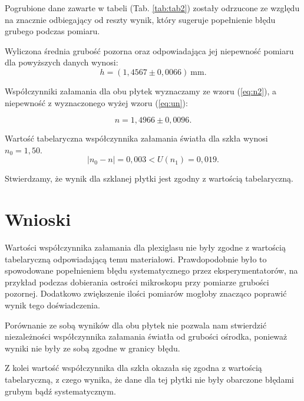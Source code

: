 \documentclass[12pt,a4paper]{article}
\numberwithin{equation}{section}
\begin{document}
Pogrubione dane zawarte w tabeli (Tab. \ref{tab:tab2}) zostały odrzucone ze względu na znacznie odbiegający od reszty wynik, który sugeruje popełnienie błędu grubego podczas pomiaru.

\pagebreak
Wyliczona średnia grubość pozorna oraz odpowiadająca jej niepewność pomiaru dla powyższych danych wynosi:
\begin{equation}
	h = (1,4567 \pm 0,0066)~\textrm{mm}.
\end{equation}

Współczynniki załamania dla obu płytek wyznaczamy ze wzoru (\ref{eq:n2}), a niepewność z wyznaczonego wyżej wzoru (\ref{eq:un}):

\begin{equation}
	n = 1,4966 \pm 0,0096.
\end{equation}

Wartość tabelaryczna współczynnika załamania światła dla szkła wynosi $n_0 = 1,50$.
\begin{equation}
	|n_0 - n| = 0,003 < U(n_1) = 0,019.
\end{equation}

Stwierdzamy, że wynik dla szklanej płytki jest zgodny z wartością tabelaryczną.

\section{Wnioski}

Wartości współczynnika załamania dla plexiglasu nie były zgodne z wartością tabelaryczną odpowiadającą temu materiałowi. Prawdopodobnie było to spowodowane popełnieniem błędu systematycznego przez eksperymentatorów, na przykład podczas dobierania ostrości mikroskopu przy pomiarze grubości pozornej. Dodatkowo zwiększenie ilości pomiarów mogłoby znacząco poprawić wynik tego doświadczenia.

Porównanie ze sobą wyników dla obu płytek nie pozwala nam stwierdzić niezależności współczynnika załamania światła od grubości ośrodka, ponieważ wyniki nie były ze sobą zgodne w granicy błędu.

Z kolei wartość współczynnika dla szkła okazała się zgodna z wartością tabelaryczną, z czego wynika, że dane dla tej płytki nie były obarczone błędami grubym bądź systematycznym.
\end{document}
